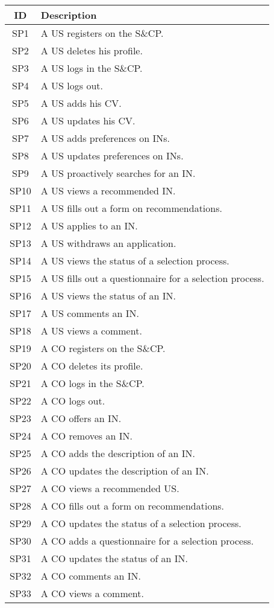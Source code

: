 \begin{longtable}{|c|p{10.5cm}|}
    \hline \rowcolor{polimiblue!40}
    \textbf{ID} & \textbf{Description} \\ \hline
    SP1 & A US registers on the S\&CP. \\ \hline
    SP2 & A US deletes his profile.\\ \hline
    SP3 & A US logs in the S\&CP. \\ \hline
    SP4 & A US logs out. \\ \hline
    SP5 & A US adds his CV. \\ \hline
    SP6 & A US updates his CV. \\ \hline
    SP7 & A US adds preferences on INs. \\ \hline
    SP8 & A US updates preferences on INs. \\ \hline
    SP9 & A US proactively searches for an IN. \\ \hline
    SP10 & A US views a recommended IN. \\ \hline
    SP11 & A US fills out a form on recommendations. \\ \hline
    SP12 & A US applies to an IN. \\ \hline
    SP13 & A US withdraws an application. \\ \hline
    SP14 & A US views the status of a selection process. \\ \hline
    SP15 & A US fills out a questionnaire for a selection process. \\ \hline
    SP16 & A US views the status of an IN. \\ \hline
    SP17 & A US comments an IN. \\ \hline
    SP18 & A US views a comment. \\ \hline

    SP19 & A CO registers on the S\&CP. \\ \hline
    SP20 & A CO deletes its profile. \\ \hline
    SP21 & A CO logs in the S\&CP. \\ \hline
    SP22 & A CO logs out. \\ \hline
    SP23 & A CO offers an IN. \\ \hline
    SP24 & A CO removes an IN. \\ \hline
    SP25 & A CO adds the description of an IN. \\ \hline
    SP26 & A CO updates the description of an IN. \\ \hline
    SP27 & A CO views a recommended US. \\ \hline
    SP28 & A CO fills out a form on recommendations. \\ \hline
    SP29 & A CO updates the status of a selection process. \\ \hline
    SP30 & A CO adds a questionnaire for a selection process. \\ \hline
    SP31 & A CO updates the status of an IN. \\ \hline
    SP32 & A CO comments an IN. \\ \hline
    SP33 & A CO views a comment. \\ \hline
    

\end{longtable}
